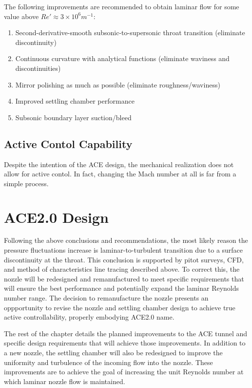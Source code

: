 The following improvements are recommended to obtain laminar flow for some value above $Re' \approx 3 \times 10^6 m^{-1}$:
\begin{enumerate}
    \item Second-derivative-smooth subsonic-to-supersonic throat transition (eliminate discontinuity)
    \item Continuous curvature with analytical functions (eliminate waviness and discontinuities)
    \item Mirror polishing as much as possible (eliminate roughness/waviness)
    \item Improved settling chamber performance
    \item Subsonic boundary layer suction/bleed
\end{enumerate}

\subsection{Active Contol Capability}

Despite the intention of the ACE design, the mechanical realization does not allow for active contol. In fact, changing the Mach number at all is far from a simple process. 

\section{ACE2.0 Design}

Following the above conclusions and recommendations, the most likely reason the pressure fluctuations increase is laminar-to-turbulent transition due to a surface discontinuity at the throat. This conclusion is supported by pitot surveys, CFD, and method of characteristics line tracing described above. To correct this, the nozzle will be redesigned and remanufactured to meet specific requirements that will ensure the best performance and potentially expand the laminar Reynolds number range. The decision to remanufacture the nozzle presents an oppportunity to revise the nozzle and settling chamber design to achieve true active controllability, properly embodying ACE2.0 name.

The rest of the chapter details the planned improvements to the ACE tunnel and specific design requirements that will achieve those improvements. In addition to a new nozzle, the settling chamber will also be redesigned to improve the uniformity and turbulence of the incoming flow into the nozzle. These improvements are to achieve the goal of increasing the unit Reynolds number at which laminar nozzle flow is maintained.

